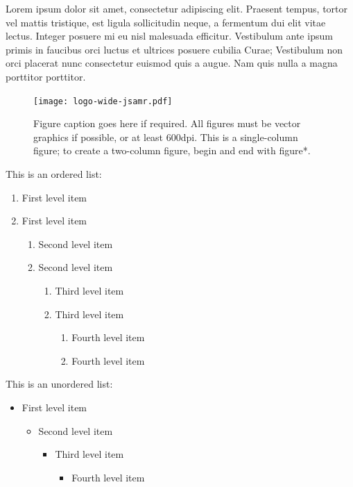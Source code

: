 \documentclass[paper=a4,fontsize=11pt,twocolumn]{article}
\begin{document}
Lorem ipsum dolor sit amet, consectetur adipiscing elit. Praesent tempus, tortor vel mattis tristique, est ligula sollicitudin neque, a fermentum dui elit vitae lectus. Integer posuere mi eu nisl malesuada efficitur. Vestibulum ante ipsum primis in faucibus orci luctus et ultrices posuere cubilia Curae; Vestibulum non orci placerat nunc consectetur euismod quis a augue. Nam quis nulla a magna porttitor porttitor. 

\begin{figure}
\centering
\texttt{[image: logo-wide-jsamr.pdf]}
\caption{Figure caption goes here if required. All figures must be vector graphics if possible, or at least 600dpi. This is a single-column figure; to create a two-column figure, begin and end with figure*.}
\label{fig:one-column}
\end{figure}

This is an ordered list:
\begin{enumerate}
   \item First level item
   \item First level item
   \begin{enumerate}
     \item Second level item
     \item Second level item
     \begin{enumerate}
       \item Third level item
       \item Third level item
       \begin{enumerate}
         \item Fourth level item
         \item Fourth level item
       \end{enumerate}
     \end{enumerate}
   \end{enumerate}
 \end{enumerate}

This is an unordered list:
 \begin{itemize}
   \item  First level item
   \begin{itemize}
     \item  Second level item
     \begin{itemize}
       \item  Third level item
       \begin{itemize}
         \item  Fourth level item
       \end{itemize}
     \end{itemize}
   \end{itemize}
 \end{itemize}
\end{document}
